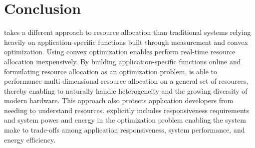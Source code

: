 \section{Conclusion}\label{conclusion}

\pacora takes a different approach to resource allocation than traditional systems relying heavily on application-specific functions built through measurement and convex optimization.  Using convex optimization enables \pacora perform real-time resource allocation inexpensively.  By building application-specific functions online and formulating resource allocation as an optimization problem, \pacora is able to performance multi-dimensional resource allocation on a general set of resources, thereby enabling \pacora to naturally handle heterogeneity and the growing diversity of modern hardware. This approach also protects application developers from needing to understand resources. \pacora explicitly includes responsiveness requirements and system power and energy in the optimization problem enabling the system make to trade-offs among application responsiveness, system performance, and energy efficiency.




